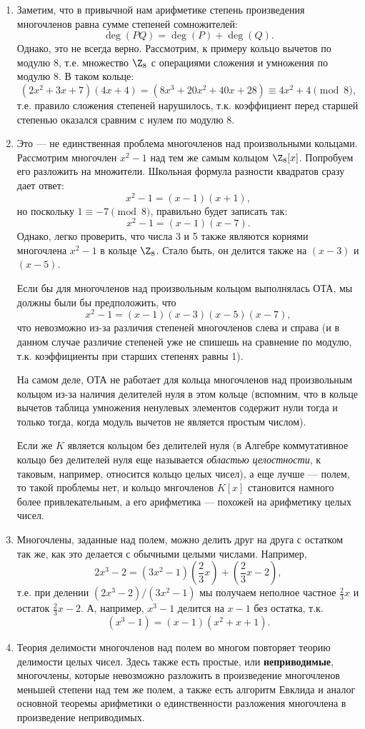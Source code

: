 \begin{enumerate}
\item Заметим, что в привычной нам арифметике степень произведения многочленов равна сумме степеней сомножителей:
$$
\deg(PQ)=\deg(P)+\deg(Q).
$$
Однако, это не всегда верно. Рассмотрим, к примеру кольцо вычетов по модулю $8$, т.е. множество $\Z_8$ с операциями сложения и умножения по модулю $8$. В таком кольце:
$$
(2x^2+3x+7)(4x+4) = (8x^3+20x^2+40x+28) \equiv 4x^2+4\pmod 8,
$$
т.е. правило сложения степеней нарушилось, т.к. коэффициент перед старшей степенью оказался сравним с нулем по модулю $8$.
\item Это --- не единственная проблема многочленов над произвольными кольцами. Рассмотрим многочлен $x^2-1$ над тем же самым кольцом $\Z_8[x]$.
Попробуем его разложить на множители. Школьная формула разности квадратов сразу дает ответ:
$$
x^2-1=(x-1)(x+1),
$$
но поскольку $1\equiv -7\pmod 8$, правильно будет записать так:
$$
x^2-1=(x-1)(x-7).
$$
Однако, легко проверить, что числа 3 и 5 также являются корнями многочлена $x^2-1$ в кольце $\Z_8$. Стало быть, он делится также на $(x-3)$ и $(x-5)$.

Если бы для многочленов над произвольным кольцом выполнялась ОТА, мы должны были бы предположить, что
$$
x^2-1=(x-1)(x-3)(x-5)(x-7),
$$
что невозможно из-за различия степеней многочленов слева и справа (и в данном случае различие степеней уже не спишешь на сравнение по модулю, т.к. коэффициенты при старших степенях равны 1).

На самом деле, ОТА не работает для кольца многочленов над произвольным кольцом из-за наличия делителей нуля в этом кольце (вспомним, что в кольце вычетов таблица умножения ненулевых элементов содержит нули тогда и только тогда, когда модуль вычетов не является простым числом).

Если же $K$ является кольцом без делителей нуля (в Алгебре коммутативное кольцо без делителей нуля еще называется \textit{областью целостности}, к таковым, например, относится кольцо целых чисел), а еще лучше --- полем, то такой проблемы нет, и кольцо мнгочленов $K[x]$ становится намного более привлекательным, а его арифметика --- похожей на арифметику целых чисел.




\item Многочлены, заданные над полем, можно делить друг на друга с остатком так же, как это делается с обычными целыми числами. Например, 
$$
2x^3-2=(3x^2-1)\left(\frac23x\right) + \left(\frac23x-2\right),
$$
т.е. при делении $(2x^3-2)/(3x^2-1)$ мы получаем неполное частное $\frac23x$ и остаток $\frac23x-2$. А, например, $x^3-1$ делится на $x-1$ без остатка, т.к.
$$
(x^3-1)=(x-1)(x^2+x+1).
$$
\item Теория делимости многочленов над полем во многом повторяет теорию делимости целых чисел. Здесь также есть простые, или \textbf{неприводимые}, многочлены, которые невозможно разложить в произведение многочленов меньшей степени над тем же полем, а также есть алгоритм Евклида и аналог основной теоремы арифметики о единственности разложения многочлена в произведение неприводимых.


\end{enumerate}
